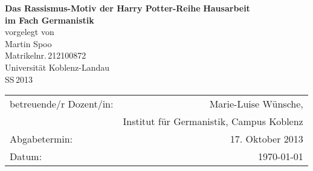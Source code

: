 \begin{titlepage}
	\begin{center}
		\quad
		\vfill
		\Huge{
			 \textbf{Das Rassismus-Motiv der \glqq{}Harry Potter\grqq{}-Reihe}
		}
		\vspace{5mm}
		\vfill
		\large{
			{\bf Hausarbeit\\
			im Fach Germanistik}
		}
		\\
		\vspace{0.5cm}
		\large{
			{vorgelegt von\\
			Martin Spoo\\
			Matrikelnr.\,212100872}
		}
		\vspace{1cm}
		\\
		\Large{
			{Universität Koblenz-Landau}\\
			{SS\,2013}
		}
		\vspace{1cm}
		\begin{table}[b]
			\begin{center}
				\begin{tabular}{lr}
					betreuende/r Dozent/in: & Marie-Luise Wünsche, \\
								&	Institut für Germanistik, Campus Koblenz \\
					\vspace{0.5cm}
					Abgabetermin: & 17. Oktober 2013 \\
					Datum: & \today
				\end{tabular}
			\end{center}
		\end{table}
	\end{center}
\end{titlepage}
\renewcommand{\baselinestretch}{1.1}
\restoregeometry

